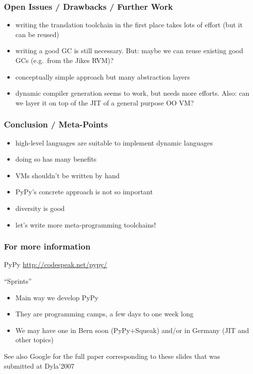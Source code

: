 \documentclass[utf8x]{beamer}
\begin{document}
\begin{frame}
  \frametitle{Open Issues / Drawbacks / Further Work}
  \begin{itemize}
  \item
    writing the translation toolchain in the first place takes lots of effort
    (but it can be reused)
  \item
    writing a good GC is still necessary. But: maybe we can reuse existing good
    GCs (e.g.\ from the Jikes RVM)?
  \item
    conceptually simple approach but many abstraction layers
  \item
    dynamic compiler generation seems to work, but needs more efforts.
    Also: can we layer it on top of the JIT of a general purpose OO VM?
  \end{itemize}
\end{frame}

\begin{frame}
  \frametitle{Conclusion / Meta-Points}
  \begin{itemize}
  \item
    high-level languages are suitable to implement dynamic languages
  \item
    doing so has many benefits
  \item
    VMs shouldn't be written by hand
  \item
    PyPy's concrete approach is not so important
  \item
    diversity is good
  \item
    let's write more meta-programming toolchains!
  \end{itemize}
\end{frame}

\begin{frame}
  \frametitle{For more information}
  \begin{block}{
    PyPy}
    \bigskip
    \hskip 1cm \url{http://codespeak.net/pypy/}
    \bigskip
  \end{block}
  \begin{block}{
    ``Sprints''}
    \begin{itemize}
    \item Main way we develop PyPy
    \item They are programming camps, a few days to one week long
    \item We may have one in Bern soon (PyPy+Squeak) and/or in
          Germany (JIT and other topics)
    \end{itemize}
  \end{block}
  \begin{block}{
    See also}
    Google for the full paper corresponding to these slides
    that was submitted at Dyla'2007
  \end{block}
\end{frame}
\end{document}
